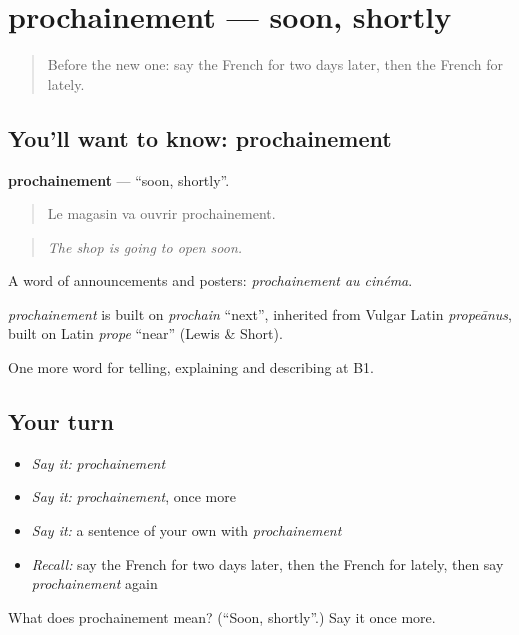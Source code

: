 \section[prochainement]{prochainement — soon, shortly}

\label{lesson:FR-C273-prochainement}



\begin{quote}
Before the new one: say the French for two days later, then the French for lately.
\end{quote}

\subsection*{You'll want to know: prochainement}
\textbf{prochainement} — \textquotedblleft{}soon, shortly\textquotedblright{}.

\begin{quote}
Le magasin va ouvrir prochainement.
\end{quote}

\begin{quote}
\emph{The shop is going to open soon.}
\end{quote}

A word of announcements and posters: \emph{prochainement au cinéma}.

\begin{cousinweb}
\emph{prochainement} is built on \emph{prochain} \textquotedblleft{}next\textquotedblright{}, inherited from Vulgar Latin \emph{propeānus}, built on Latin \emph{prope} \textquotedblleft{}near\textquotedblright{} (Lewis \& Short).
\end{cousinweb}

\begin{grammarlens}[title={What you've built}]
One more word for telling, explaining and describing at B1.
\end{grammarlens}

\subsection*{Your turn}
\begin{itemize}
\raggedright
  \item \emph{Say it:} \emph{prochainement}
  \item \emph{Say it:} \emph{prochainement}, once more
  \item \emph{Say it:} a sentence of your own with \emph{prochainement}
  \item \emph{Recall:} say the French for two days later, then the French for lately, then say \emph{prochainement} again
\end{itemize}

\begin{tcolorbox}[breakable,colback=teal!4,colframe=teal!35!black,title={Before you move on}]
What does prochainement mean? (\textquotedblleft{}Soon, shortly\textquotedblright{}.) Say it once more.
\end{tcolorbox}
